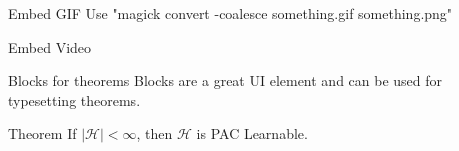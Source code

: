 \documentclass{beamer}
\begin{document}
\begin{frame}{Embed GIF}
    Use "magick convert -coalesce something.gif something.png"
    
    \centering
\end{frame}

\begin{frame}{Embed Video}
    
    \centering
\end{frame}

\begin{frame}[fragile]{Blocks for theorems}
Blocks are a great UI element and can be used for typesetting theorems.
\begin{block}{Theorem}
If $\mid \mathcal{H} \mid < \infty$, then $\mathcal{H}$ is PAC Learnable.
\end{block}
\end{frame}
\end{document}
